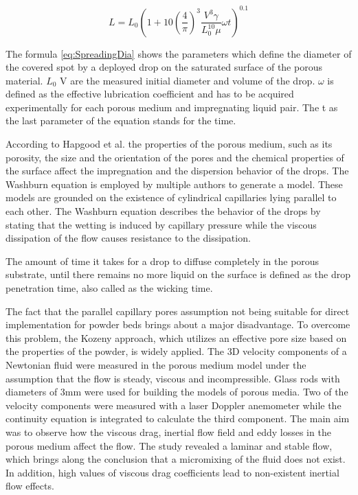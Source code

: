 \begin{equation} \label{eq:SpreadingDia}
L=L_0 (1+10(\frac{4}{\pi})^3 \frac{V^3 \gamma}{L_0^{10} \mu}\omega t)^{0.1}
\end{equation}
\newline

The formula \ref{eq:SpreadingDia} shows the parameters which define the diameter of the covered spot by a deployed drop on the saturated surface of the porous material. $L_0$ V are the measured initial diameter and volume of the drop. $\omega$ is defined as the effective lubrication coefficient and has to be acquired experimentally for each porous medium and impregnating liquid pair. The t as the last parameter of the equation stands for the time. 

According to Hapgood et al. the properties of the porous medium, such as its porosity, the size and the orientation of the pores and the chemical properties of the surface affect the impregnation and the dispersion behavior of the drops. The Washburn equation is employed by multiple authors to generate a model. These models are grounded on the existence of cylindrical capillaries lying parallel to each other. The Washburn equation describes the behavior of the drops by stating that the wetting is induced by capillary pressure while the viscous dissipation of the flow causes resistance to the dissipation.

The amount of time it takes for a drop to diffuse completely in the porous substrate, until there remains no more liquid on the surface is defined as the drop penetration time, also called as the wicking time.

The fact that the parallel capillary pores assumption not being suitable for direct implementation for powder beds brings about a major disadvantage. To overcome this problem, the Kozeny approach, which utilizes an effective pore size based on the properties of the powder, is widely applied. The 3D velocity components of a Newtonian fluid were measured in the porous medium model under the assumption that the flow is steady, viscous and incompressible. Glass rods with diameters of 3mm were used for building the models of porous media. Two of the velocity components were measured with a laser Doppler anemometer while the  continuity equation is integrated to calculate the third component. The main aim was to observe how the viscous drag, inertial flow field and eddy losses in the porous medium affect the flow. The study revealed a laminar and stable  flow, which brings along the conclusion  that a micromixing of the fluid does not exist. In addition, high values of viscous drag coefficients lead to non-existent inertial flow effects.

